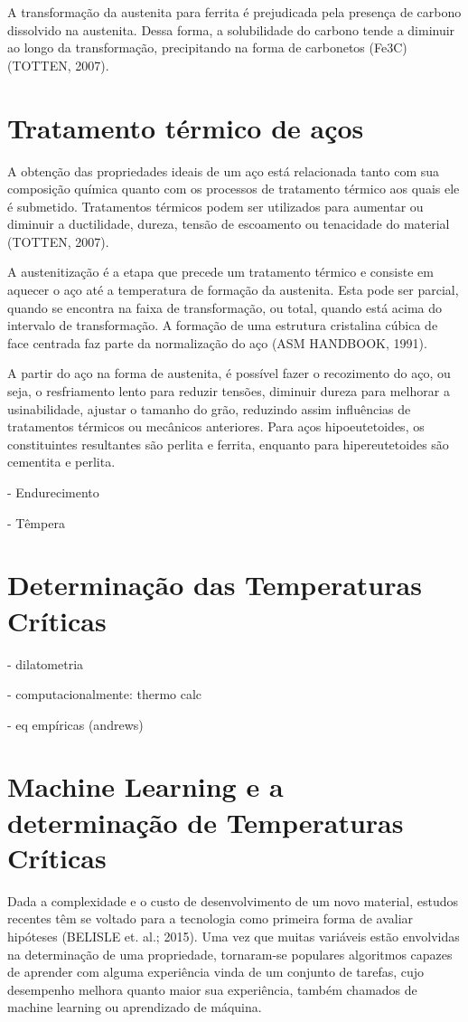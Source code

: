 \documentclass[hidelinks,brazil,dissertacao,epusp]{usp}
\begin{document}
A transformação da austenita para ferrita é prejudicada pela presença de carbono dissolvido na austenita. Dessa forma, a solubilidade do carbono tende a diminuir ao longo da transformação, precipitando na forma de carbonetos (Fe3C) (TOTTEN, 2007).

\section{Tratamento térmico de aços}

A obtenção das propriedades ideais de um aço está relacionada tanto com sua composição química quanto com os processos de tratamento térmico aos quais ele é submetido. Tratamentos térmicos podem ser utilizados para aumentar ou diminuir a ductilidade, dureza, tensão de escoamento ou tenacidade do material (TOTTEN, 2007).

A austenitização é a etapa que precede um tratamento térmico e consiste em aquecer o aço até a temperatura de formação da austenita. Esta pode ser parcial, quando se encontra na faixa de transformação, ou total, quando está acima do intervalo de transformação. A formação de uma estrutura cristalina cúbica de face centrada faz parte da normalização do aço (ASM HANDBOOK, 1991). 

A partir do aço na forma de austenita, é possível fazer o recozimento do aço, ou seja, o resfriamento lento para reduzir tensões, diminuir dureza para melhorar a usinabilidade, ajustar o tamanho do grão, reduzindo assim influências de tratamentos térmicos ou mecânicos anteriores. Para aços hipoeutetoides, os constituintes resultantes são perlita e ferrita, enquanto para hipereutetoides são cementita e perlita.

- Endurecimento

- Têmpera
    
\section{Determinação das Temperaturas Críticas}

- dilatometria

- computacionalmente: thermo calc

- eq empíricas (andrews)


\section{Machine Learning e a determinação de Temperaturas Críticas}

Dada a complexidade e o custo de desenvolvimento de um novo material, estudos recentes têm se voltado para a tecnologia como primeira forma de avaliar hipóteses (BELISLE et. al.; 2015). Uma vez que muitas variáveis estão envolvidas na determinação de uma propriedade, tornaram-se populares algoritmos capazes de aprender com alguma experiência vinda de um conjunto de tarefas,  cujo desempenho melhora quanto maior sua experiência, também chamados de machine learning ou aprendizado de máquina.
\end{document}

